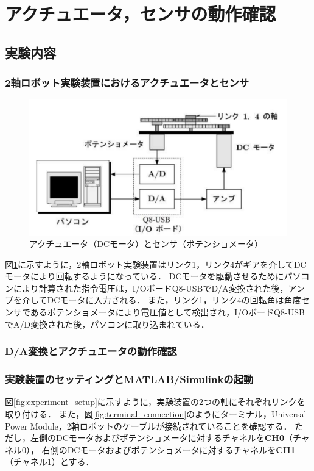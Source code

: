 \section{アクチュエータ，センサの動作確認}

\subsection{実験内容}
\subsubsection{2軸ロボット実験装置におけるアクチュエータとセンサ}

\begin{figure}[H]
    \centering
    \includegraphics[width=0.8\linewidth]{figure/actuator_sensor.pdf}
    \caption{アクチュエータ（DCモータ）とセンサ（ポテンショメータ）}
    \label{fig:actuator_sensor}
\end{figure}

図\ref{fig:actuator_sensor}に示すように，2軸ロボット実験装置はリンク1，リンク4がギアを介してDCモータにより回転するようになっている．
DCモータを駆動させるためにパソコンにより計算された指令電圧は，I/OボードQ8-USBでD/A変換された後，アンプを介してDCモータに入力される．
また，リンク1，リンク4の回転角は角度センサであるポテンショメータにより電圧値として検出され，I/OボードQ8-USBでA/D変換された後，パソコンに取り込まれている．

\subsubsection{D/A変換とアクチュエータの動作確認}
\subsubsection{実験装置のセッティングと\textbf{MATLAB}/Simulinkの起動}

図\ref{fig:experiment_setup}に示すように，実験装置の2つの軸にそれぞれリンクを取り付ける．
また，図\ref{fig:terminal_connection}のようにターミナル，Universal Power Module，2軸ロボットのケーブルが接続されていることを確認する．
ただし，左側のDCモータおよびポテンショメータに対するチャネルを\textbf{CH0}（チャネル0），
右側のDCモータおよびポテンショメータに対するチャネルを\textbf{CH1}（チャネル1）とする．


